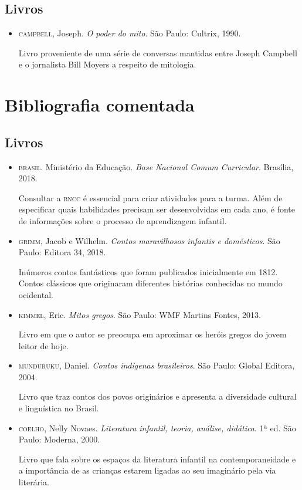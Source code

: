 \documentclass[11pt]{extarticle}
\begin{document}
\subsection{Livros} 

\begin{itemize}
\item \textsc{campbell}, Joseph. \textit{O poder do mito}. São Paulo: Cultrix, 1990.

Livro proveniente de uma série de conversas mantidas entre Joseph Campbell e o jornalista Bill Moyers a respeito de mitologia.
\end{itemize}

\section{Bibliografia comentada}
\subsection{Livros}

\begin{itemize}
\item \textsc{brasil}. Ministério da Educação. \textit{Base Nacional Comum Curricular}. Brasília, 2018.

Consultar a \textsc{bncc} é essencial para criar atividades para a turma. Além de especificar quais habilidades precisam ser desenvolvidas em cada ano, é fonte de informações sobre o processo de aprendizagem infantil. 
 
 \item \textsc{grimm}, Jacob e Wilhelm. \textit{Contos maravilhosos infantis e domésticos}. São Paulo: Editora 34, 2018.

Inúmeros contos fantásticos que foram publicados inicialmente em 1812. Contos clássicos que originaram diferentes histórias conhecidas no mundo ocidental.

\item \textsc{kimmel}, Eric. \textit{Mitos gregos}. São Paulo: WMF Martins Fontes, 2013.

Livro em que o autor se preocupa em aproximar os heróis gregos do jovem leitor de hoje.

\item \textsc{munduruku}, Daniel. \textit{Contos indígenas brasileiros}. São Paulo: Global Editora, 2004.

Livro que traz contos dos povos originários e apresenta a diversidade cultural e linguística no Brasil.

\item \textsc{coelho}, Nelly Novaes. \textit{Literatura infantil, teoria, análise, didática}. 1ª ed. São Paulo: Moderna, 2000.

Livro que fala sobre os espaços da literatura infantil na contemporaneidade e a importância de as crianças estarem ligadas ao seu imaginário pela via literária.

\end{itemize}
\end{document}
